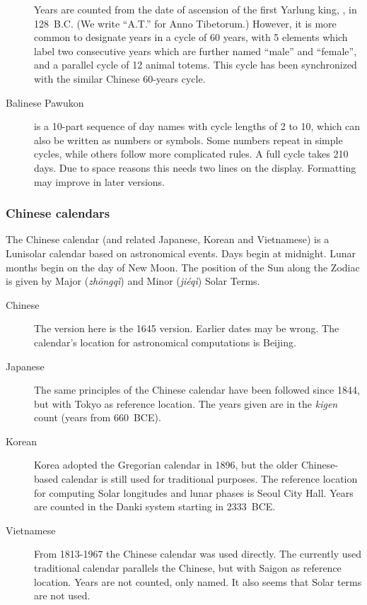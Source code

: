 \begin{description}
  Years are counted from the date of ascension of the first Yarlung
  king, , in 128~B.C. (We write ``A.T.'' for Anno
  Tibetorum.) However, it is more common to designate years in a cycle
  of 60 years, with 5 elements which label two consecutive years which
  are further named ``male'' and ``female'', and a parallel cycle of
  12 animal totems. This cycle has been synchronized with the similar
  Chinese 60-years cycle.
  
\item[Balinese Pawukon] is a 10-part sequence of day names with cycle
  lengths of 2 to 10, which can also be written as numbers or
  symbols. Some numbers repeat in simple cycles, while others follow
  more complicated rules. A full cycle takes 210 days.  Due to space
  reasons this needs two lines on the display. Formatting may improve
  in later versions.
\end{description}

\subsubsection{Chinese calendars}
The Chinese calendar (and related Japanese, Korean and Vietnamese)
is a Lunisolar calendar based on astronomical events.
Days begin at midnight. Lunar months begin on the day of New Moon.
The position of the Sun along the Zodiac is given by Major (\emph{zh\={o}ngqì})
and Minor (\emph{jiéqì}) Solar Terms.

\begin{description}
\item[Chinese] The version here is the 1645 version. Earlier dates may be wrong.
  The calendar's location for astronomical computations is Beijing.
\item[Japanese] The same principles of the Chinese calendar have been
  followed since 1844, but with Tokyo as reference location. The years
  given are in the \emph{kigen} count (years from 660~BCE).
\item[Korean] Korea adopted the Gregorian calendar in 1896, but the
  older Chinese-based calendar is still used for traditional
  purposes. The reference location for computing Solar longitudes and
  lunar phases is Seoul City Hall. Years are counted in the Danki
  system starting in 2333~BCE.
\item[Vietnamese] From 1813-1967 the Chinese calendar was used
  directly. The currently used traditional calendar parallels the
  Chinese, but with Saigon as reference location. Years are not counted, only named.
  It also seems that Solar terms are not used.
\end{description}


